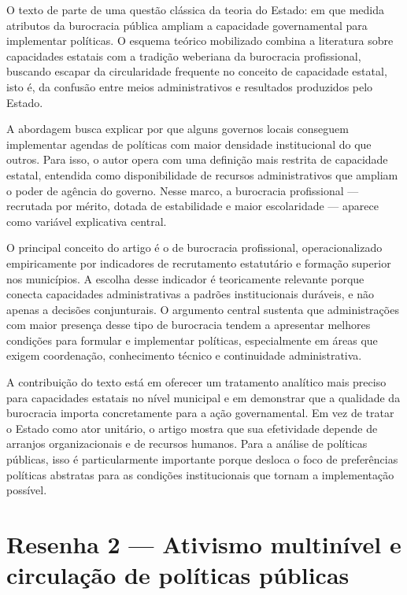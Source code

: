 \documentclass[12pt,a4paper]{article}
\begin{document}
O texto de \textcite{marenco2017_burocracias_profissionais} parte de uma questão clássica da teoria do Estado: em que medida atributos da burocracia pública ampliam a capacidade governamental para implementar políticas. O esquema teórico mobilizado combina a literatura sobre capacidades estatais com a tradição weberiana da burocracia profissional, buscando escapar da circularidade frequente no conceito de capacidade estatal, isto é, da confusão entre meios administrativos e resultados produzidos pelo Estado.

A abordagem busca explicar por que alguns governos locais conseguem implementar agendas de políticas com maior densidade institucional do que outros. Para isso, o autor opera com uma definição mais restrita de capacidade estatal, entendida como disponibilidade de recursos administrativos que ampliam o poder de agência do governo. Nesse marco, a burocracia profissional — recrutada por mérito, dotada de estabilidade e maior escolaridade — aparece como variável explicativa central.

O principal conceito do artigo é o de burocracia profissional, operacionalizado empiricamente por indicadores de recrutamento estatutário e formação superior nos municípios. A escolha desse indicador é teoricamente relevante porque conecta capacidades administrativas a padrões institucionais duráveis, e não apenas a decisões conjunturais. O argumento central sustenta que administrações com maior presença desse tipo de burocracia tendem a apresentar melhores condições para formular e implementar políticas, especialmente em áreas que exigem coordenação, conhecimento técnico e continuidade administrativa.

A contribuição do texto está em oferecer um tratamento analítico mais preciso para capacidades estatais no nível municipal e em demonstrar que a qualidade da burocracia importa concretamente para a ação governamental. Em vez de tratar o Estado como ator unitário, o artigo mostra que sua efetividade depende de arranjos organizacionais e de recursos humanos. Para a análise de políticas públicas, isso é particularmente importante porque desloca o foco de preferências políticas abstratas para as condições institucionais que tornam a implementação possível.



\section{Resenha 2 — Ativismo multinível e circulação de políticas públicas}
\label{sec:org2767d37}
\end{document}
